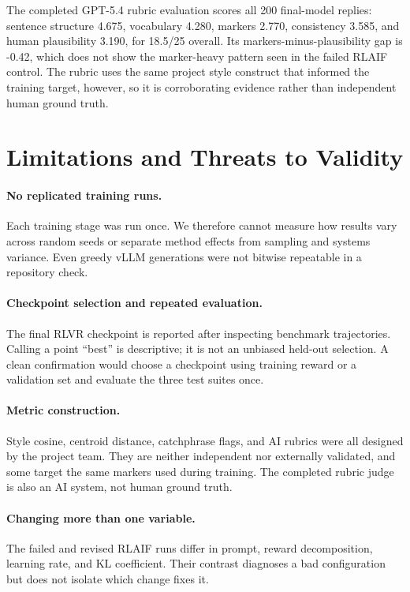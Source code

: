 \documentclass[10pt,twocolumn]{article}
\begin{document}
The completed GPT-5.4 rubric evaluation scores all 200 final-model replies: sentence
structure 4.675, vocabulary 4.280, markers 2.770, consistency 3.585, and human
plausibility 3.190, for 18.5/25 overall. Its markers-minus-plausibility gap is -0.42,
which does not show the marker-heavy pattern seen in the failed RLAIF control. The rubric
uses the same project style construct that informed the training target, however, so it
is corroborating evidence rather than independent human ground truth.

\section{Limitations and Threats to Validity}
\label{sec:limitations}

\paragraph{No replicated training runs.}
Each training stage was run once. We therefore cannot measure how results vary across
random seeds or separate method effects from sampling and systems variance. Even greedy
vLLM generations were not bitwise repeatable in a repository check.

\paragraph{Checkpoint selection and repeated evaluation.}
The final RLVR checkpoint is reported after inspecting benchmark trajectories.
Calling a point ``best'' is descriptive; it is not an unbiased held-out selection. A clean
confirmation would choose a checkpoint using training reward or a validation set and
evaluate the three test suites once.

\paragraph{Metric construction.}
Style cosine, centroid distance, catchphrase flags, and AI rubrics were all designed by
the project team. They are neither independent nor externally validated, and some target
the same markers used during training. The completed rubric judge is also an AI system,
not human ground truth.

\paragraph{Changing more than one variable.}
The failed and revised RLAIF runs differ in prompt, reward decomposition, learning rate,
and KL coefficient. Their contrast diagnoses a bad configuration but does not isolate
which change fixes it.
\end{document}

